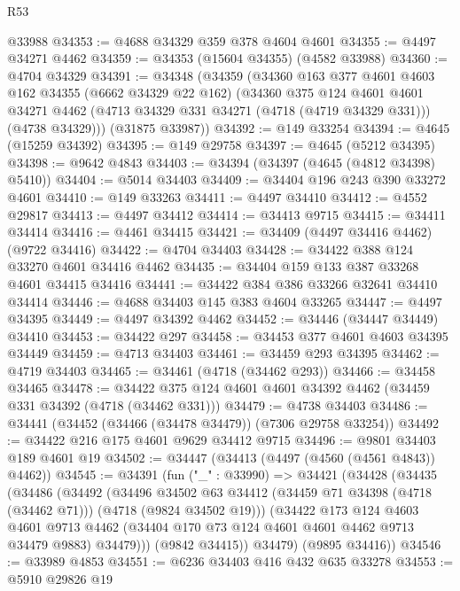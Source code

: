 \begin{lexlean}{R53}
\begin{coremodule}
    @33988
@34353 := @4688 @34329 @359 @378 @4604 @4601
@34355 := @4497 @34271 @4462
@34359 := @34353 (@15604 @34355) (@4582 @33988)
@34360 := @4704 @34329
@34391 := @34348
    (@34359
      (@34360
        @163
        @377
        @4601
        @4603
        @162
        @34355
        (@6662 @34329 @22 @162)
        (@34360
          @375
          @124
          @4601
          @4601
          @34271
          @4462
          (@4713 @34329 @331 @34271 (@4718 (@4719 @34329 @331)))
          (@4738 @34329)))
      (@31875 @33987))
@34392 := @149 @33254
@34394 := @4645 (@15259 @34392)
@34395 := @149 @29758
@34397 := @4645 (@5212 @34395)
@34398 := @9642 @4843
@34403 := @34394 (@34397 (@4645 (@4812 @34398) @5410))
@34404 := @5014 @34403
@34409 := @34404 @196 @243 @390 @33272 @4601
@34410 := @149 @33263
@34411 := @4497 @34410
@34412 := @4552 @29817
@34413 := @4497 @34412
@34414 := @34413 @9715
@34415 := @34411 @34414
@34416 := @4461 @34415
@34421 := @34409 (@4497 @34416 @4462) (@9722 @34416)
@34422 := @4704 @34403
@34428 := @34422 @388 @124 @33270 @4601 @34416 @4462
@34435 := @34404 @159 @133 @387 @33268 @4601 @34415 @34416
@34441 := @34422 @384 @386 @33266 @32641 @34410 @34414
@34446 := @4688 @34403 @145 @383 @4604 @33265
@34447 := @4497 @34395
@34449 := @4497 @34392 @4462
@34452 := @34446 (@34447 @34449) @34410
@34453 := @34422 @297
@34458 := @34453 @377 @4601 @4603 @34395 @34449
@34459 := @4713 @34403
@34461 := @34459 @293 @34395
@34462 := @4719 @34403
@34465 := @34461 (@4718 (@34462 @293))
@34466 := @34458 @34465
@34478 := @34422 @375 @124 @4601 @4601 @34392 @4462 (@34459 @331 @34392 (@4718 (@34462 @331)))
@34479 := @4738 @34403
@34486 := @34441 (@34452 (@34466 (@34478 @34479)) (@7306 @29758 @33254))
@34492 := @34422 @216 @175 @4601 @9629 @34412 @9715
@34496 := @9801 @34403 @189 @4601 @19
@34502 := @34447 (@34413 (@4497 (@4560 (@4561 @4843)) @4462))
@34545 := @34391
    (fun ("_" : @33990) =>
    @34421
      (@34428
        (@34435
          (@34486
            (@34492
              (@34496
                @34502
                @63
                @34412
                (@34459 @71 @34398 (@4718 (@34462 @71)))
                (@4718 (@9824 @34502 @19)))
              (@34422
                @173
                @124
                @4603
                @4601
                @9713
                @4462
                (@34404 @170 @73 @124 @4601 @4601 @4462 @9713 @34479 @9883)
                @34479)))
          (@9842 @34415))
        @34479)
      (@9895 @34416))
@34546 := @33989 @4853
@34551 := @6236 @34403 @416 @432 @635 @33278
@34553 := @5910 @29826 @19

\end{coremodule}
\end{lexlean}

